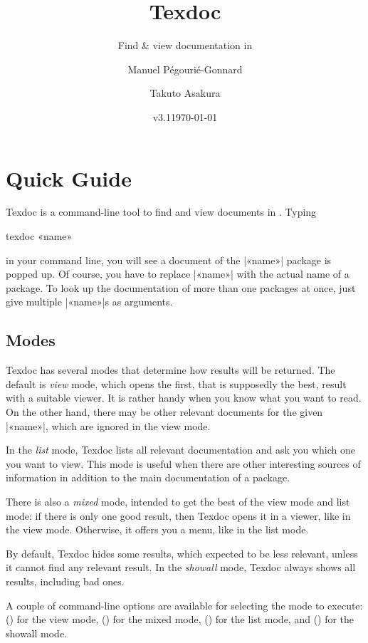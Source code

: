 \documentclass[draft]{texdoc-doc}
\title{Texdoc}
\subtitle{Find \& view documentation in \TL}
\author{Manuel Pégourié-Gonnard\and Takuto Asakura}
\date{v3.1\quad \today}
\begin{document}
\VerbatimFootnotes

\maketitle

\section{Quick Guide}

Texdoc is a command-line tool to find and view documents in {\TL}. Typing
%
\begin{htcode}
texdoc «name»
\end{htcode}
%
in your command line, you will see a document of the |«name»| package is popped
up. Of course, you have to replace |«name»| with the actual name of a package.
To look up the documentation of more than one packages at once, just give
multiple |«name»|s as arguments.

\subsection{Modes}
\label{sec:modes}

Texdoc has several modes that determine how results will be returned. The
default is \emph{view} mode, which opens the first, that is supposedly the
best, result with a suitable viewer. It is rather handy when you know what you
want to read. On the other hand, there may be other relevant documents for the
given |«name»|, which are ignored in the view mode.

In the \emph{list} mode, Texdoc lists all relevant documentation and ask you
which one you want to view. This mode is useful when there are other
interesting sources of information in addition to the main documentation of a
package.

There is also a \emph{mixed} mode, intended to get the best of the view mode
and list mode: if there is only one good result, then Texdoc opens it in a
viewer, like in the view mode. Otherwise, it offers you a menu, like in the
list mode.

By default, Texdoc hides some results, which expected to be less relevant,
unless it cannot find any relevant result. In the \emph{showall} mode, Texdoc
always shows all results, including bad ones.

A couple of command-line options are available for selecting the mode to
execute:  () for the view mode,  () for
the mixed mode,  () for the list mode, and 
() for the showall mode.
\end{document}
